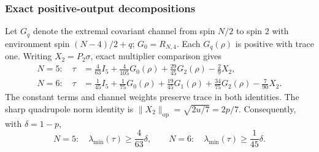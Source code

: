\documentclass[11pt,a4paper]{article}
\begin{document}
\subsubsection{Exact positive-output decompositions}
Let $G_q$ denote the extremal covariant channel from spin $N/2$ to spin
$2$ with environment spin $(N-4)/2+q$; $G_0=R_{N,4}$.
Each $G_q(\rho)$ is positive with trace one.
Writing $X_2=P_2\sigma$, exact multiplier comparison gives
\begin{align*}
N=5:\quad\tau&=\frac4{63}I_5+\frac4{105}G_0(\rho)
 +\frac{29}{45}G_2(\rho)-\frac29X_2,\\
N=6:\quad\tau&=\frac1{45}I_5+\frac1{75}G_0(\rho)
 +\frac{19}{45}G_1(\rho)+\frac{34}{75}G_2(\rho)-\frac7{90}X_2.
\end{align*}
The constant terms and channel weights preserve trace in both identities.
The sharp quadrupole norm identity is
$\|X_2\|_{\mathrm{op}}=\sqrt{2u/7}=2p/7$.
Consequently, with $\delta=1-p$,
\[
N=5:\quad\lambda_{\min}(\tau)\ge\frac4{63}\delta,
\qquad
N=6:\quad\lambda_{\min}(\tau)\ge\frac1{45}\delta.
\]
\end{document}
